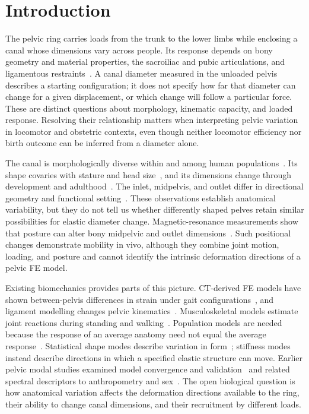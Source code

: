 \documentclass[pdflatex,sn-basic]{sn-jnl}
\begin{document}
\section{Introduction}\label{sec:introduction}
The pelvic ring carries loads from the trunk to the lower limbs while enclosing a canal whose dimensions vary across people. Its response depends on bony geometry and material properties, the sacroiliac and pubic articulations, and ligamentous restraints~\citep{Snijders1993,Vleeming2012}. A canal diameter measured in the unloaded pelvis describes a starting configuration; it does not specify how far that diameter can change for a given displacement, or which change will follow a particular force. These are distinct questions about morphology, kinematic capacity, and loaded response. Resolving their relationship matters when interpreting pelvic variation in locomotor and obstetric contexts, even though neither locomotor efficiency nor birth outcome can be inferred from a diameter alone.

The canal is morphologically diverse within and among human populations~\citep{BettiManica2018}. Its shape covaries with stature and head size~\citep{FischerMitteroecker2015}, and its dimensions change through development and adulthood~\citep{Huseynov2016}. The inlet, midpelvis, and outlet differ in directional geometry and functional setting~\citep{StansfieldCanal2021}. These observations establish anatomical variability, but they do not tell us whether differently shaped pelves retain similar possibilities for elastic diameter change. Magnetic-resonance measurements show that posture can alter bony midpelvic and outlet dimensions~\citep{Reitter2014}. Such positional changes demonstrate mobility in vivo, although they combine joint motion, loading, and posture and cannot identify the intrinsic deformation directions of a pelvic FE model.

Existing biomechanics provides parts of this picture. CT-derived FE models have shown between-pelvis differences in strain under gait configurations~\citep{Salo2017PelvicStrain}, and ligament modelling changes pelvic kinematics~\citep{Henys2022Ligaments}. Musculoskeletal models estimate joint reactions during standing and walking~\citep{Chen2026PelvicModel}. Population models are needed because the response of an average anatomy need not equal the average response~\citep{CookRobertson2016,Fernandez2020Population}. Statistical shape modes describe variation in form~\citep{Arand2019PelvicShape}; stiffness modes instead describe directions in which a specified elastic structure can move. Earlier pelvic modal studies examined model convergence and validation~\citep{HenysCapek2019Modal} and related spectral descriptors to anthropometry and sex~\citep{Henys2021Eigenmetric}. The open biological question is how anatomical variation affects the deformation directions available to the ring, their ability to change canal dimensions, and their recruitment by different loads.
\end{document}
